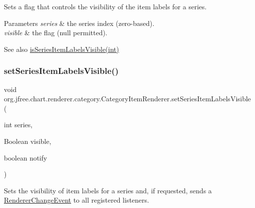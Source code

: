 Sets a flag that controls the visibility of the item labels for a series.


\begin{DoxyParams}{Parameters}
{\em series} & the series index (zero-\/based). \\
\hline
{\em visible} & the flag ({\ttfamily null} permitted).\\
\hline
\end{DoxyParams}
\begin{DoxySeeAlso}{See also}
\mbox{\hyperlink{interfaceorg_1_1jfree_1_1chart_1_1renderer_1_1category_1_1_category_item_renderer_ab37b75d719d1386f107829cddf9eb1b2}{is\+Series\+Item\+Labels\+Visible(int)}} 
\end{DoxySeeAlso}
\mbox{\label{interfaceorg_1_1jfree_1_1chart_1_1renderer_1_1category_1_1_category_item_renderer_a72da4632864d702099baba455d3f8576}} 
\subsubsection{\texorpdfstring{set\+Series\+Item\+Labels\+Visible()}{setSeriesItemLabelsVisible()}\hspace{0.1cm}{\footnotesize\ttfamily [3/3]}}
{\footnotesize\ttfamily void org.\+jfree.\+chart.\+renderer.\+category.\+Category\+Item\+Renderer.\+set\+Series\+Item\+Labels\+Visible (\begin{DoxyParamCaption}\item[{int}]{series,  }\item[{Boolean}]{visible,  }\item[{boolean}]{notify }\end{DoxyParamCaption})}

Sets the visibility of item labels for a series and, if requested, sends a \mbox{\hyperlink{}{Renderer\+Change\+Event}} to all registered listeners.


